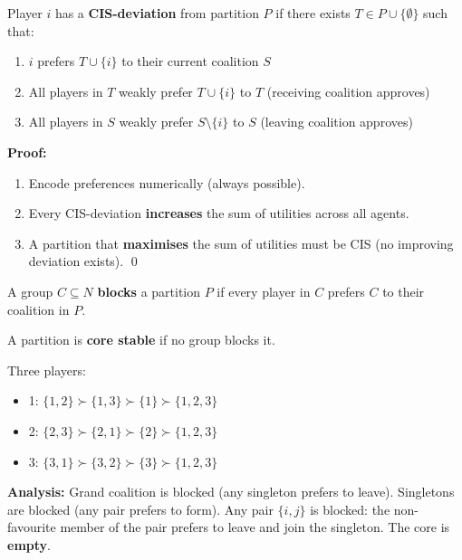 \begin{defbox}
Player $i$ has a \textbf{CIS-deviation} from partition $P$ if there exists $T \in P \cup \{\emptyset\}$ such that:
\begin{enumerate}
  \item $i$ prefers $T \cup \{i\}$ to their current coalition $S$
  \item All players in $T$ weakly prefer $T \cup \{i\}$ to $T$ \quad (receiving coalition approves)
  \item All players in $S$ weakly prefer $S \setminus \{i\}$ to $S$ \quad (leaving coalition approves)
\end{enumerate}
\end{defbox}

\begin{thmbox}
\textbf{Proof:}
\begin{enumerate}
  \item Encode preferences numerically (always possible).
  \item Every CIS-deviation \textbf{increases} the sum of utilities across all agents.
  \item A partition that \textbf{maximises} the sum of utilities must be CIS (no improving deviation exists). \qed
\end{enumerate}
\end{thmbox}

\begin{defbox}
A group $C \subseteq N$ \textbf{blocks} a partition $P$ if every player in $C$ prefers $C$ to their coalition in $P$.

A partition is \textbf{core stable} if no group blocks it.
\end{defbox}

\begin{exbox}
Three players:
\begin{itemize}
  \item 1: $\{1, 2\} \succ \{1, 3\} \succ \{1\} \succ \{1, 2, 3\}$
  \item 2: $\{2, 3\} \succ \{2, 1\} \succ \{2\} \succ \{1, 2, 3\}$
  \item 3: $\{3, 1\} \succ \{3, 2\} \succ \{3\} \succ \{1, 2, 3\}$
\end{itemize}

\textbf{Analysis:} Grand coalition is blocked (any singleton prefers to leave). Singletons are blocked (any pair prefers to form). Any pair $\{i,j\}$ is blocked: the non-favourite member of the pair prefers to leave and join the singleton. The core is \textbf{empty}.
\end{exbox}

